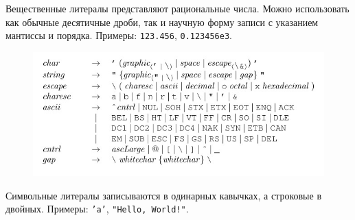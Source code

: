 Вещественные литералы представляют рациональные числа. Можно использовать как
обычные десятичные дроби, так и научную форму записи с указанием мантиссы и
порядка. Примеры: \texttt{123.456}, \texttt{0.123456e3}.

\begin{figure}[H]
\centering
\includegraphics[scale=0.66]{pic-char-string-literals}
\end{figure}

Символьные литералы записываются в одинарных кавычках, а строковые в двойных.
Примеры: \texttt{'a'}, \texttt{"Hello, World!"}.

